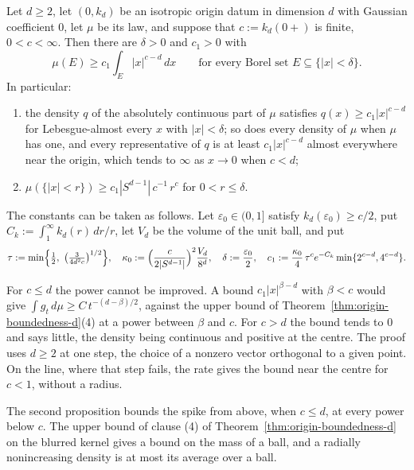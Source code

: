 \begin{proposition}\label{prop:origin-lower-bound-d}
Let $d \ge 2$, let $(0, k_d)$ be an isotropic origin datum in dimension $d$ with Gaussian
coefficient $0$, let $\mu$ be its law, and suppose that $c := k_d(0{+})$ is finite, $0 < c < \infty$.
Then there are $\delta > 0$ and $c_1 > 0$ with
\begin{equation}\label{eq:origin-lower-bound}
  \mu(E) \ge c_1\int_E |x|^{c-d}\,dx \qquad\text{for every Borel set } E \subseteq \{|x| < \delta\} .
\end{equation}
In particular:
\begin{enumerate}
\item the density $q$ of the absolutely continuous part of $\mu$ satisfies
$q(x) \ge c_1|x|^{c-d}$ for Lebesgue-almost every $x$ with $|x| < \delta$; so does every density of
$\mu$ when $\mu$ has one, and every representative of $q$ is at least
$c_1|x|^{c-d}$ almost everywhere near the origin, which tends to $\infty$ as $x \to 0$ when $c < d$;
\item $\mu(\{|x| < r\}) \ge c_1|S^{d-1}|\,c^{-1}\,r^{c}$ for $0 < r \le \delta$.
\end{enumerate}
The constants can be taken as follows. Let $\varepsilon_0 \in (0,1]$ satisfy
$k_d(\varepsilon_0) \ge c/2$, put $C_k := \int_1^\infty k_d(r)\,dr/r$, let $V_d$ be the volume of the
unit ball, and put
\[
  \tau := \min\Bigl\{\tfrac12,\ \bigl(\tfrac{3}{4d^2c}\bigr)^{1/2}\Bigr\},\quad
  \kappa_0 := \Bigl(\frac{c}{2|S^{d-1}|}\Bigr)^{2}\frac{V_d}{8^d},\quad
  \delta := \frac{\varepsilon_0}{2},\quad
  c_1 := \frac{\kappa_0}{4}\,\tau^{c}e^{-C_k}\min\{2^{c-d},4^{c-d}\} .
\]
\end{proposition}

For $c \le d$ the power cannot be improved. A bound $c_1|x|^{\beta-d}$ with $\beta < c$ would give
$\int g_t\,d\mu \ge C\,t^{-(d-\beta)/2}$, against the upper bound of
Theorem~\ref{thm:origin-boundedness-d}(4) at a power between $\beta$ and $c$. For $c > d$ the
bound tends to $0$ and says little, the density being continuous and positive at the centre.
The proof uses $d \ge 2$ at one step, the choice of a nonzero vector orthogonal to a given
point. On the line, where that step fails, the rate gives the bound near the centre for
$c < 1$, without a radius.

The second proposition bounds the spike from above, when $c \le d$, at every power below $c$.
The upper bound of clause (4) of Theorem~\ref{thm:origin-boundedness-d} on the blurred kernel
gives a bound on the mass of a ball, and a radially nonincreasing density is at most its
average over a ball.

